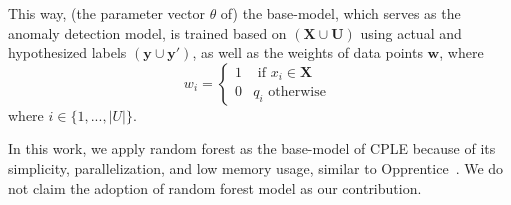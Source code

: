 This way, (the parameter vector $\theta$ of) the base-model, which serves as the anomaly detection model, is trained based on $(\mathbf{X\cup U})$ using actual and hypothesized labels $(\mathbf{y\cup y'})$, as well as the weights of data points $\mathbf{w}$, where
\begin{equation}\label{eq:weight}
w_i=\begin{cases}
 1& \text{ if } x_i\in \mathbf{X}\\ 
 0&  q_i \text{ otherwise }
\end{cases}
\end{equation}
where $i\in\{1,...,|U|\}$.

In this work, we apply random forest as the base-model of CPLE because of its simplicity, parallelization, and low memory usage, similar to Opprentice~\cite{liu2015opprentice}. We do not claim the adoption of random forest model as our contribution. 





  
